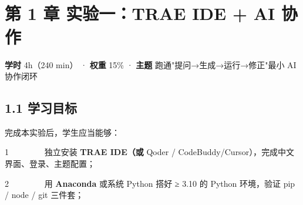 \documentclass[
  american,
  chinese,
]{ctexart}
\begin{document}
\foreignlanguage{american}{\hfill\break
}

\foreignlanguage{american}{}

~

\foreignlanguage{american}{}

~

\clearpage

\section{\texorpdfstring{{第}\foreignlanguage{american}{ 1 }{章}{ }{实验{一}：}\foreignlanguage{american}{TRAE IDE + AI }{协作}\foreignlanguage{american}{}}{第 1 章 实验一：TRAE IDE + AI 协作}}\label{ux7b2c-1-ux7ae0-ux5b9eux9a8cux4e00trae-ide-ai-ux534fux4f5c}

\textbf{{学时}}\foreignlanguage{american}{ 4h}{（}\foreignlanguage{american}{240 min}{）}{ \foreignlanguage{american}{· }}\textbf{{权重}}\foreignlanguage{american}{ 15\% · }\textbf{{主题}}{ }{跑通}\foreignlanguage{american}{"}{提问}\foreignlanguage{american}{→}{生成}\foreignlanguage{american}{→}{运行}\foreignlanguage{american}{→}{修正}\foreignlanguage{american}{"}{最小}\foreignlanguage{american}{ AI }{协作闭环}\foreignlanguage{american}{}

\subsection{\texorpdfstring{\foreignlanguage{american}{1.1 }{学习目标}\foreignlanguage{american}{}}{1.1 学习目标}}\label{ux5b66ux4e60ux76eeux6807}

{完成本实验后，学生应当能够：}\foreignlanguage{american}{}

\foreignlanguage{american}{{1{~~~~~~~~
}}}{\foreignlanguage{american}{独立安装}}\foreignlanguage{american}{ \textbf{TRAE {IDE{（或}}} {Qoder} / }{\foreignlanguage{american}{CodeBuddy}}\foreignlanguage{american}{/}\foreignlanguage{american}{Cursor}\foreignlanguage{american}{），{完成中文界面、登录、{主题配置}}{；}}

\foreignlanguage{american}{{2{~~~~~~~~
}}}\foreignlanguage{american}{用}\foreignlanguage{american}{ \textbf{Anaconda} }{\foreignlanguage{american}{或系统}}\foreignlanguage{american}{ Python }{\foreignlanguage{american}{搭好}}\foreignlanguage{american}{ ≥ 3.10 }\foreignlanguage{american}{的}\foreignlanguage{american}{ Python }{\foreignlanguage{american}{环境，验证}}\foreignlanguage{american}{ pip / node / git }{{\foreignlanguage{american}{三件套}}}{\foreignlanguage{american}{；}}
\end{document}
